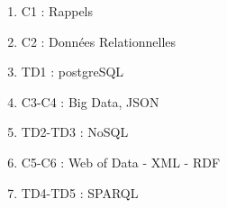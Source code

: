 \begin{enumerate}
	\item C1 : Rappels
	\item C2 : Données Relationnelles
	\item TD1 : postgreSQL
	\item C3-C4 : Big Data, JSON
	\item TD2-TD3 : NoSQL
	\item C5-C6 : Web of Data - XML - RDF
	\item TD4-TD5 : SPARQL
\end{enumerate}
